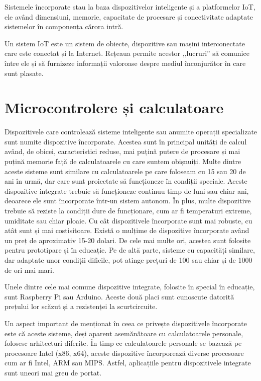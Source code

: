 Sistemele încorporate stau la baza dispozitivelor inteligente și a platformelor
IoT, ele având dimensiuni, memorie, capacitate de procesare și conectivitate
adaptate sistemelor în componența cărora intră.

Un sistem IoT este un sistem de obiecte, dispozitive sau mașini interconectate
care este conectat și la Internet. Rețeaua permite acestor ,,lucruri'' să comunice
între ele și să furnizeze informații valoroase despre mediul înconjurător în
care sunt plasate.

\section{Microcontrolere și calculatoare}
\label{sec:embed:micro-comp}

Dispozitivele care controlează sisteme
inteligente sau anumite operații specializate sunt numite dispozitive
încorporate. Acestea sunt în principal unități de calcul având, de obicei,
caracteristici reduse, mai puțină putere de procesare și mai puțină memorie față
de calculatoarele cu care suntem obișnuiți. Multe dintre aceste sisteme sunt
similare cu calculatoarele pe care foloseam cu 15 sau 20 de ani în urmă, dar
care sunt proiectate să funcționeze în condiții speciale. Aceste dispozitive
integrate trebuie să funcționeze continuu timp de luni sau chiar ani, deoarece
ele sunt încorporate într-un sistem autonom. În plus, multe dispozitive trebuie
să reziste la condiții dure de funcționare, cum ar fi temperaturi extreme,
umiditate sau chiar ploaie. Cu cât dispozitivele încorporate sunt mai robuste, cu
atât sunt și mai costisitoare. Există o mulțime de dispozitive
încorporate având un preț de aproximativ 15-20 dolari. De cele mai multe ori,
acestea sunt folosite pentru prototipare și în educație. Pe de altă parte,
sisteme cu capacități similare, dar adaptate unor condiții dificile, pot atinge
prețuri de 100 sau chiar și de 1000 de ori mai mari.

Unele dintre cele mai comune dispozitive integrate, folosite în special în
educație, sunt Raspberry Pi sau Arduino. Aceste două placi sunt cunoscute
datorită prețului lor scăzut și a rezistenței la scurtcircuite.

Un aspect important de menționat în ceea ce privește dispozitivele încorporate
este că aceste sisteme, deși aparent asemănătoare cu calculatoarele personale,
folosesc arhitecturi diferite. În timp ce calculatoarele personale se bazează pe
procesoare Intel (x86, x64), aceste dispozitive încorporează diverse procesoare
cum ar fi Intel, ARM sau MIPS. Astfel, aplicațiile pentru dispozitivele
integrate sunt uneori mai greu de portat.

